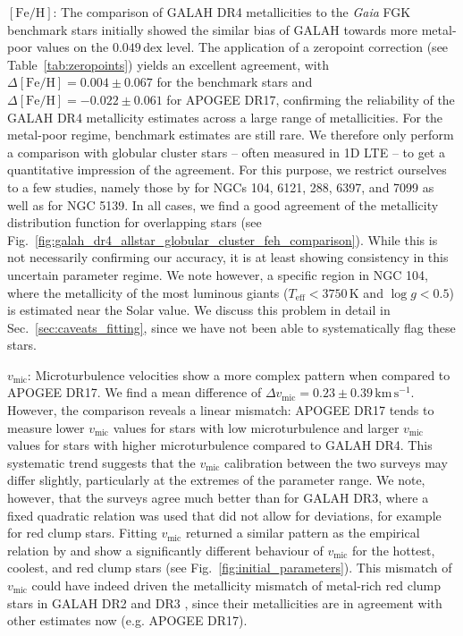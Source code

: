 \documentclass[
  journal=pasa,
  manuscript=research-paper, %
  year=2024,
  volume=37
]{cup-journal}
\newcommand{\feh}{$\mathrm{[Fe/H]}$\xspace}
\newcommand{\vmic}{$v_\mathrm{mic}$\xspace}
\newcommand{\Gaia}{\textit{Gaia}\xspace}
\begin{document}
\feh: The comparison of GALAH DR4 metallicities to the \Gaia FGK benchmark stars initially showed the similar bias of GALAH towards more metal-poor values on the $0.049\,\mathrm{dex}$ level. The application of a zeropoint correction (see Table~\ref{tab:zeropoints}) yields an excellent agreement, with $\Delta \mathrm{[Fe/H]} = 0.004 \pm 0.067$ for the benchmark stars and $\Delta \mathrm{[Fe/H]} = -0.022 \pm 0.061$ for APOGEE DR17, confirming the reliability of the GALAH DR4 metallicity estimates across a large range of metallicities. For the metal-poor regime, benchmark estimates are still rare. We therefore only perform a comparison with globular cluster stars -- often measured in 1D LTE -- to get a quantitative impression of the agreement. For this purpose, we restrict ourselves to a few studies, namely those by \citet{Carretta2009, Carretta2009c} for NGCs 104, 6121, 288, 6397, and 7099 as well as \citet{Johnson2010} for NGC 5139. In all cases, we find a good agreement of the metallicity distribution function for overlapping stars (see Fig.~\ref{fig:galah_dr4_allstar_globular_cluster_feh_comparison}). While this is not necessarily confirming our accuracy, it is at least showing consistency in this uncertain parameter regime. We note however, a specific region in NGC 104, where the metallicity of the most luminous giants ($T_\mathrm{eff} < 3750\,\mathrm{K}$ and $\log g < 0.5$) is estimated near the Solar value. We discuss this problem in detail in Sec.~\ref{sec:caveats_fitting}, since we have not been able to systematically flag these stars.

\vmic: Microturbulence velocities show a more complex pattern when compared to APOGEE DR17. We find a mean difference of $\Delta v_\mathrm{mic} = 0.23 \pm 0.39\,\mathrm{km\,s^{-1}}$. However, the comparison reveals a linear mismatch: APOGEE DR17 tends to measure lower \vmic values for stars with low microturbulence and larger \vmic values for stars with higher microturbulence compared to GALAH DR4. This systematic trend suggests that the \vmic calibration between the two surveys may differ slightly, particularly at the extremes of the parameter range. We note, however, that the surveys agree much better than for GALAH DR3, where a fixed quadratic relation was used that did not allow for deviations, for example for red clump stars. Fitting \vmic returned a similar pattern as the empirical relation by \citet{DutraFerreira2016} and show a significantly different behaviour of \vmic for the hottest, coolest, and red clump stars (see Fig.~\ref{fig:initial_parameters}). This mismatch of \vmic could have indeed driven the metallicity mismatch of metal-rich red clump stars in GALAH DR2 and DR3 \citep{Buder2018, Buder2021}, since their metallicities are in agreement with other estimates now (e.g. APOGEE DR17).
\end{document}

